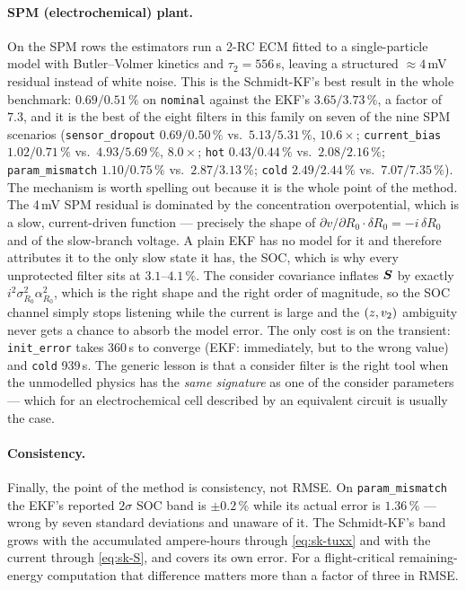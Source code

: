 \paragraph{SPM (electrochemical) plant.}  On the SPM rows the estimators run a 2-RC ECM fitted to a
single-particle model with Butler--Volmer kinetics and $\tau_2=556$\,s, leaving a structured
$\approx4$\,mV residual instead of white noise.  This is the Schmidt-KF's best result in the whole
benchmark: $0.69/0.51\,\%$ on \texttt{nominal} against the EKF's $3.65/3.73\,\%$, a factor of
$7.3$, and it is the best of the eight filters in this family on seven of the nine SPM scenarios
(\texttt{sensor\_dropout} $0.69/0.50\,\%$ vs.\ $5.13/5.31\,\%$, $10.6\times$;
\texttt{current\_bias} $1.02/0.71\,\%$ vs.\ $4.93/5.69\,\%$, $8.0\times$; \texttt{hot}
$0.43/0.44\,\%$ vs.\ $2.08/2.16\,\%$; \texttt{param\_mismatch} $1.10/0.75\,\%$ vs.\
$2.87/3.13\,\%$; \texttt{cold} $2.49/2.44\,\%$ vs.\ $7.07/7.35\,\%$).  The mechanism is worth
spelling out because it is the whole point of the method.  The 4\,mV SPM residual is dominated by
the concentration overpotential, which is a slow, current-driven function --- precisely the shape
of $\partial v/\partial R_0 \cdot \delta R_0 = -i\,\delta R_0$ and of the slow-branch voltage.  A
plain EKF has no model for it and therefore attributes it to the only slow state it has, the SOC,
which is why every unprotected filter sits at $3.1$--$4.1\,\%$.  The consider covariance inflates
$\bm{S}$ by exactly $i^2\sigma_{R_0}^2\alpha_{R_0}^2$, which is the right shape and the right order of
magnitude, so the SOC channel simply stops listening while the current is large and the
$(z,v_2)$ ambiguity never gets a chance to absorb the model error.  The only cost is on the
transient: \texttt{init\_error} takes 360\,s to converge (EKF: immediately, but to the wrong value)
and \texttt{cold} 939\,s.  The generic lesson is that a consider filter is the right tool when the
unmodelled physics has the \emph{same signature} as one of the consider parameters --- which for an
electrochemical cell described by an equivalent circuit is usually the case.

\paragraph{Consistency.}  Finally, the point of the method is consistency, not RMSE.  On
\texttt{param\_mismatch} the EKF's reported $2\sigma$ SOC band is $\pm0.2\,\%$ while its actual
error is $1.36\,\%$ --- wrong by seven standard deviations and unaware of it.  The Schmidt-KF's band
grows with the accumulated ampere-hours through \eqref{eq:sk-tuxx} and with the current through
\eqref{eq:sk-S}, and covers its own error.  For a flight-critical remaining-energy computation that
difference matters more than a factor of three in RMSE.

